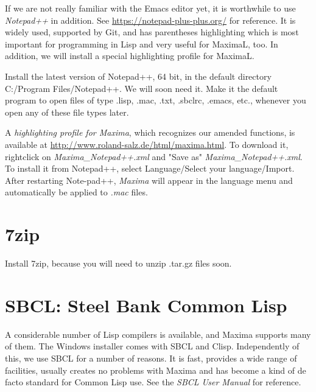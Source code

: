\documentclass[../Maxima_Workbook.tex]{subfiles}
\begin{document}
If we are not really familiar with the Emacs editor yet, it is worthwhile to use \emph{Notepad++} in addition. See \href{https://notepad-plus-plus.org/}{https://notepad-plus-plus.org/} for reference. It is widely used, supported by Git, and has parentheses highlighting which is most important for programming in Lisp and very useful for MaximaL, too. In addition, we will install a special highlighting profile for MaximaL. 

\lz Install the latest version of Notepad++, 64 bit, in the default directory C:/Program Files/Notepad++. We will soon need it. Make it the default program to open files of type .lisp, .mac, .txt, .sbclrc, .emacs, etc., whenever you open any of these file types later.

\lz A \emph{highlighting profile for Maxima}, which recognizes our amended functions, is available at \href{http://www.roland-salz.de/html/maxima.html}{http://www.roland-salz.de/html/maxima.html}. To download it, rightclick on \emph{Maxima\_Notepad++.xml} and "Save as" \emph{Maxima\_Notepad++.xml}. To install it from Notepad++, select Language/Select your language/Import. After restarting Note-pad++, \emph{Maxima} will appear in the language menu and automatically be applied to \emph{.mac} files.


\section{7zip}

Install 7zip, because you will need to unzip .tar.gz files soon.

\section{SBCL: Steel Bank Common Lisp}

A considerable number of Lisp compilers is available, and Maxima supports many of them. The Windows installer comes with SBCL and Clisp. Independently of this, we use SBCL for a number of reasons. It is fast, provides a wide range of facilities, usually creates no problems with Maxima and has become a kind of de facto standard for Common Lisp use. See the \emph{SBCL User Manual} for reference.
\end{document}
